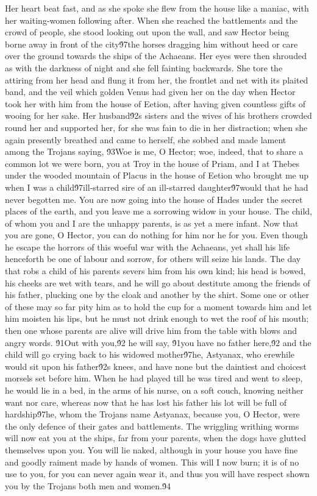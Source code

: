 {Her heart beat fast, and as she spoke she flew from the house like a maniac, with her waiting-women following after. When she reached the battlements and the crowd of people, she stood looking out upon the wall, and saw Hector being borne away in front of the city\'97the horses dragging him without heed or care over the ground towards the ships of the Achaeans. Her eyes were then shrouded as with the darkness of night and she fell fainting backwards. She tore the attiring from her head and flung it from her, the frontlet and net with its plaited band, and the veil which golden Venus had given her on the day when Hector took her with him from the house of Eetion, after having given countless gifts of wooing for her sake. Her husband\'92s sisters and the wives of his brothers crowded round her and supported her, for she was fain to die in her distraction; when she again presently breathed and came to herself, she sobbed and made lament among the Trojans saying, \'93Woe is me, O Hector; woe, indeed, that to share a common lot we were born, you at Troy in the house of Priam, and I at Thebes under the wooded mountain of Placus in the house of Eetion who brought me up when I was a child\'97ill-starred sire of an ill-starred daughter\'97would that he had never begotten me. You are now going into the house of Hades under the secret places of the earth, and you leave me a sorrowing widow in your house. The child, of whom you and I are the unhappy parents, is as yet a mere infant. Now that you are gone, O Hector, you can do nothing for him nor he for you. Even though he escape the horrors of this woeful war with the Achaeans, yet shall his life henceforth be one of labour and sorrow, for others will seize his lands. The day that robs a child of his parents severs him from his own kind; his head is bowed, his cheeks are wet with tears, and he will go about destitute among the friends of his father, plucking one by the cloak and another by the shirt. Some one or other of these may so far pity him as to hold the cup for a moment towards him and let him moisten his lips, but he must not drink enough to wet the roof of his mouth; then one whose parents are alive will drive him from the table with blows and angry words. \'91Out with you,\'92 he will say, \'91you have no father here,\'92 and the child will go crying back to his widowed mother\'97he, Astyanax, who erewhile would sit upon his father\'92s knees, and have none but the daintiest and choicest morsels set before him. When he had played till he was tired and went to sleep, he would lie in a bed, in the arms of his nurse, on a soft couch, knowing neither want nor care, whereas now that he has lost his father his lot will be full of hardship\'97he, whom the Trojans name Astyanax, because you, O Hector, were the only defence of their gates and battlements. The wriggling writhing worms will now eat you at the ships, far from your parents, when the dogs have glutted themselves upon you. You will lie naked, although in your house you have fine and goodly raiment made by hands of women. This will I now burn; it is of no use to you, for you can never again wear it, and thus you will have respect shown you by the Trojans both men and women.\'94\
}
